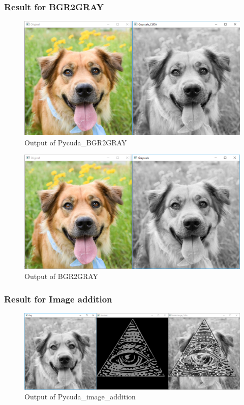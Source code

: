 \documentclass[11pt]{article}
\begin{document}
\subsubsection*{Result for BGR2GRAY}
\begin{figure}[h]
\centering
\includegraphics[scale=0.49]{out1}
\caption{Output of Pycuda\_BGR2GRAY}
\end{figure}

\begin{figure}[h]
\centering
\includegraphics[scale=0.49]{out2}
\caption{Output of BGR2GRAY}
\end{figure}


\newpage
\subsubsection*{Result for Image addition}
\begin{figure}[h]
\centering
\includegraphics[scale=0.42]{out3}
\caption{Output of Pycuda\_image\_addition}
\end{figure}
\end{document}

